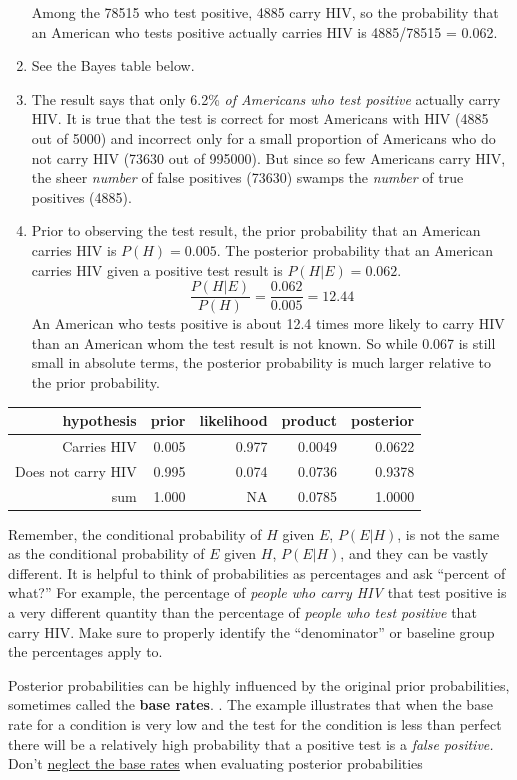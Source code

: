 \documentclass[
]{book}
\theoremstyle{definition}
\theoremstyle{definition}
\theoremstyle{definition}
\theoremstyle{remark}
\begin{document}
\begin{enumerate}
  Among the 78515 who test positive, 4885 carry HIV, so the probability that an American who tests positive actually carries HIV is 4885/78515 = 0.062.
\item
  See the Bayes table below.
\item
  The result says that only 6.2\% \emph{of Americans who test positive} actually carry HIV. It is true that the test is correct for most Americans with HIV (4885 out of 5000) and incorrect only for a small proportion of Americans who do not carry HIV (73630 out of 995000). But since so few Americans carry HIV, the sheer \emph{number} of false positives (73630) swamps the \emph{number} of true positives (4885).
\item
  Prior to observing the test result, the prior probability that an American carries HIV is \(P(H) = 0.005\). The posterior probability that an American carries HIV given a positive test result is \(P(H|E)=0.062\).
  \[
    \frac{P(H|E)}{P(H)} = \frac{0.062}{0.005} =  12.44
  \]
  An American who tests positive is about 12.4 times more likely to carry HIV than an American whom the test result is not known. So while 0.067 is still small in absolute terms, the posterior probability is much larger relative to the prior probability.
\end{enumerate}

\begin{tabular}{r|r|r|r|r}
\hline
hypothesis & prior & likelihood & product & posterior\\
\hline
Carries HIV & 0.005 & 0.977 & 0.0049 & 0.0622\\
\hline
Does not carry HIV & 0.995 & 0.074 & 0.0736 & 0.9378\\
\hline
sum & 1.000 & NA & 0.0785 & 1.0000\\
\hline
\end{tabular}

Remember, the conditional probability of \(H\) given \(E\), \(P(E|H)\), is not the same as the conditional probability of \(E\) given \(H\), \(P(E|H)\), and they can be vastly different. It is helpful to think of probabilities as percentages and ask ``percent of what?'' For example, the percentage of \emph{people who carry HIV} that test positive is a very different quantity than the percentage of \emph{people who test positive} that carry HIV. Make sure to properly identify the ``denominator'' or baseline group the percentages apply to.

Posterior probabilities can be highly influenced by the original prior probabilities, sometimes called the \textbf{base rates}. . The example illustrates that when the base rate for a condition is very low and the test for the condition is less than perfect there will be a relatively high probability that a positive test is a \emph{false positive.} Don't \href{https://en.wikipedia.org/wiki/Base_rate_fallacy}{neglect the base rates} when evaluating posterior probabilities
\end{document}
